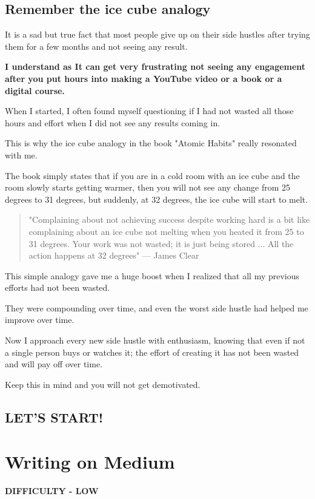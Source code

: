 \documentclass[11pt]{article}
\begin{document}
\subsection*{Remember the ice cube analogy}
It is a sad but true fact that most people give up on their side hustles after trying them for a few months and not seeing any result.

\textbf{I understand as It can get very frustrating not seeing any engagement after you put hours into making a YouTube video or a book or a digital course.}

When I started, I often found myself questioning if I had not wasted all those hours and effort when I did not see any results coming in.

This is why the ice cube analogy in the book "Atomic Habits" really resonated with me.

The book simply states that if you are in a cold room with an ice cube and the room slowly starts getting warmer, then you will not see any change from 25 degrees to 31 degrees, but suddenly, at 32 degrees, the ice cube will start to melt.

\begin{quote}
"Complaining about not achieving success despite working hard is a bit like complaining about an ice cube not melting when you heated it from 25 to 31 degrees. Your work was not wasted; it is just being stored ... All the action happens at 32 degrees" — James Clear
\end{quote}

This simple analogy gave me a huge boost when I realized that all my previous efforts had not been wasted.

They were compounding over time, and even the worst side hustle had helped me improve over time.

Now I approach every new side hustle with enthusiasm, knowing that even if not a single person buys or watches it; the effort of creating it has not been wasted and will pay off over time.

Keep this in mind and you will not get demotivated.

\subsection*{LET'S START!}

\section*{Writing on Medium}
\textbf{DIFFICULTY - LOW}
\end{document}
